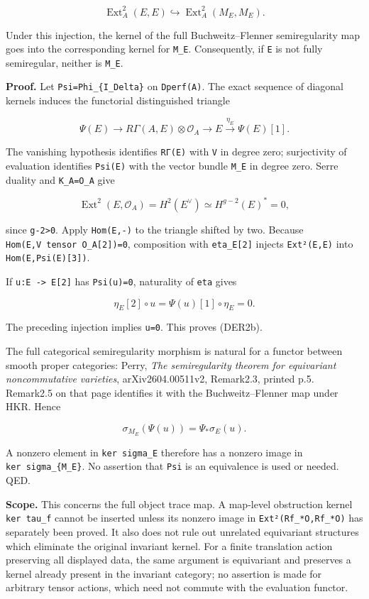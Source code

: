 \documentclass[11pt,a4paper]{article}
\theoremstyle{definition}
\begin{document}
\[
 \operatorname{Ext}^2_A(E,E)
 \hookrightarrow \operatorname{Ext}^2_A(M_E,M_E).
\tag{DER2b}
\]

Under this injection, the kernel of the full Buchweitz--Flenner
semiregularity map goes into the corresponding kernel for \texttt{M\_E}.
Consequently, if \texttt{E} is not fully semiregular, neither is
\texttt{M\_E}.

\textbf{Proof.} Let \texttt{Psi=Phi\_\{I\_Delta\}} on \texttt{Dperf(A)}.
The exact sequence of diagonal kernels induces the functorial
distinguished triangle

\[
 \Psi(E)\longrightarrow R\Gamma(A,E)\otimes\mathcal O_A
 \longrightarrow E\xrightarrow{\eta_E}\Psi(E)[1].
\]

The vanishing hypothesis identifies \texttt{RΓ(E)} with \texttt{V} in
degree zero; surjectivity of evaluation identifies \texttt{Psi(E)} with
the vector bundle \texttt{M\_E} in degree zero. Serre duality and
\texttt{K\_A=O\_A} give

\[
 \operatorname{Ext}^2(E,\mathcal O_A)
 =H^2(E^\vee)
 \simeq H^{g-2}(E)^*=0,
\]

since \texttt{g-2\textgreater{}0}. Apply \texttt{Hom(E,-)} to the
triangle shifted by two. Because
\texttt{Hom(E,V\ tensor\ O\_A{[}2{]})=0}, composition with
\texttt{eta\_E{[}2{]}} injects \texttt{Ext²(E,E)} into
\texttt{Hom(E,Psi(E){[}3{]})}.

If \texttt{u:E\ -\textgreater{}\ E{[}2{]}} has \texttt{Psi(u)=0},
naturality of \texttt{eta} gives

\[
 \eta_E[2]\circ u=\Psi(u)[1]\circ\eta_E=0.
\]

The preceding injection implies \texttt{u=0}. This proves (DER2b).

The full categorical semiregularity morphism is natural for a functor
between smooth proper categories: Perry, \emph{The semiregularity
theorem for equivariant noncommutative varieties}, arXiv2604.00511v2,
Remark2.3, printed p.5. Remark2.5 on that page identifies it with the
Buchweitz--Flenner map under HKR. Hence

\[
 \sigma_{M_E}(\Psi(u))=\Psi_*\sigma_E(u).
\]

A nonzero element in \texttt{ker\ sigma\_E} therefore has a nonzero
image in \texttt{ker\ sigma\_\{M\_E\}}. No assertion that \texttt{Psi}
is an equivalence is used or needed. QED.

\textbf{Scope.} This concerns the full object trace map. A map-level
obstruction kernel \texttt{ker\ tau\_f} cannot be inserted unless its
nonzero image in \texttt{Ext²(Rf\_*O,Rf\_*O)} has separately been
proved. It also does not rule out unrelated equivariant structures which
eliminate the original invariant kernel. For a finite translation action
preserving all displayed data, the same argument is equivariant and
preserves a kernel already present in the invariant category; no
assertion is made for arbitrary tensor actions, which need not commute
with the evaluation functor.
\end{document}
